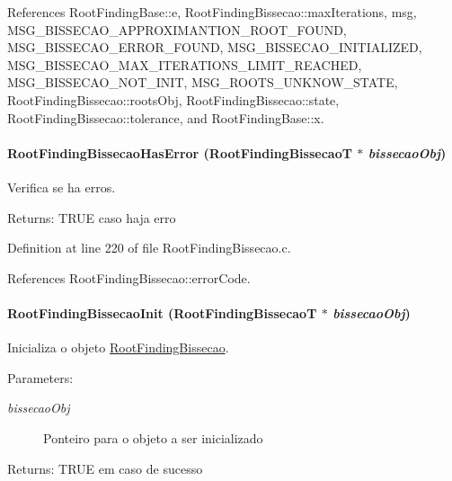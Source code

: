 References RootFindingBase::e, RootFindingBissecao::maxIterations, msg, MSG\_\-BISSECAO\_\-APPROXIMANTION\_\-ROOT\_\-FOUND, MSG\_\-BISSECAO\_\-ERROR\_\-FOUND, MSG\_\-BISSECAO\_\-INITIALIZED, MSG\_\-BISSECAO\_\-MAX\_\-ITERATIONS\_\-LIMIT\_\-REACHED, MSG\_\-BISSECAO\_\-NOT\_\-INIT, MSG\_\-ROOTS\_\-UNKNOW\_\-STATE, RootFindingBissecao::rootsObj, RootFindingBissecao::state, RootFindingBissecao::tolerance, and RootFindingBase::x.\hypertarget{group____bissecao_gbcac5093ad9f3d46feb5d7eb89bb2a75}{
\paragraph[RootFindingBissecaoHasError]{ RootFindingBissecaoHasError ({\bf RootFindingBissecaoT} $\ast$ {\em bissecaoObj})}\hfill}
\label{group____bissecao_gbcac5093ad9f3d46feb5d7eb89bb2a75}


Verifica se ha erros. 

\begin{Desc}
\item[Returns:]TRUE caso haja erro \end{Desc}


Definition at line 220 of file RootFindingBissecao.c.

References RootFindingBissecao::errorCode.\hypertarget{group____bissecao_g565bfd11019354823afbcffe501801c8}{
\paragraph[RootFindingBissecaoInit]{ RootFindingBissecaoInit ({\bf RootFindingBissecaoT} $\ast$ {\em bissecaoObj})}\hfill}
\label{group____bissecao_g565bfd11019354823afbcffe501801c8}


Inicializa o objeto \hyperlink{structRootFindingBissecao}{RootFindingBissecao}. 

\begin{Desc}
\item[Parameters:]
\begin{description}
\item[{\em bissecaoObj}]Ponteiro para o objeto a ser inicializado \end{description}
\end{Desc}
\begin{Desc}
\item[Returns:]TRUE em caso de sucesso \end{Desc}


